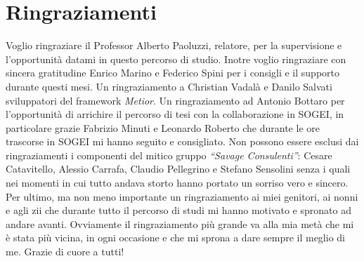 \chapter{Ringraziamenti}
\label{cha:acknowledgements}

Voglio ringraziare il Professor Alberto Paoluzzi, relatore, per la supervisione e l'opportunità datami in questo percorso di studio.
Inotre voglio ringraziare con sincera gratitudine Enrico Marino e Federico Spini per i consigli e il supporto durante questi mesi.
Un ringraziamento a Christian Vadalà e Danilo Salvati sviluppatori del framework \emph{Metior}.
Un ringraziamento ad Antonio Bottaro per l'opportunità di arrichire il percorso di tesi con la collaborazione in SOGEI, in particolare
 grazie Fabrizio Minuti e Leonardo Roberto che durante le ore trascorse in SOGEI mi hanno seguito e consigliato.
Non possono essere esclusi dai ringraziamenti i componenti del mitico gruppo \emph{``Savage Consulenti''}: Cesare Catavitello, Alessio Carrafa,
Claudio Pellegrino e Stefano Sensolini senza i quali nei momenti in cui tutto andava storto hanno portato un sorriso vero e sincero.
Per ultimo, ma non meno importante un ringraziamento ai miei genitori, ai nonni e agli zii che durante tutto il percorso
di studi mi hanno motivato e spronato ad andare avanti.
Ovviamente il ringraziamento più grande va alla mia metà che mi è stata più vicina, in ogni occasione e che mi sprona
a dare sempre il meglio di me. Grazie di cuore a tutti!
